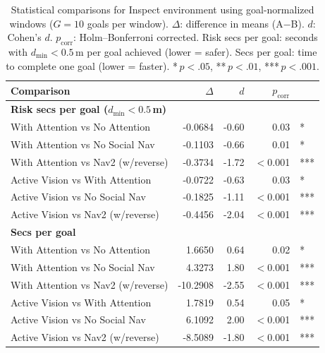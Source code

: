 \begin{table}[h]
\centering
\small
\begin{tabular}{lrrrl}
\toprule
\textbf{Comparison} & \textbf{$\Delta$} & \textbf{$d$} & \textbf{$p_{\mathrm{corr}}$} & \\
\midrule
\multicolumn{5}{l}{\textbf{Risk secs per goal ($d_{\min} < 0.5$\,m)}} \\
\quad With Attention vs No Attention & -0.0684 & -0.60 & 0.03 & * \\
\quad With Attention vs No Social Nav & -0.1103 & -0.66 & 0.01 & * \\
\quad With Attention vs Nav2 (w/reverse) & -0.3734 & -1.72 & $<$0.001 & *** \\
\quad Active Vision vs With Attention & -0.0722 & -0.63 & 0.03 & * \\
\quad Active Vision vs No Social Nav & -0.1825 & -1.11 & $<$0.001 & *** \\
\quad Active Vision vs Nav2 (w/reverse) & -0.4456 & -2.04 & $<$0.001 & *** \\
\midrule
\multicolumn{5}{l}{\textbf{Secs per goal}} \\
\quad With Attention vs No Attention & 1.6650 & 0.64 & 0.02 & * \\
\quad With Attention vs No Social Nav & 4.3273 & 1.80 & $<$0.001 & *** \\
\quad With Attention vs Nav2 (w/reverse) & -10.2908 & -2.55 & $<$0.001 & *** \\
\quad Active Vision vs With Attention & 1.7819 & 0.54 & 0.05 & * \\
\quad Active Vision vs No Social Nav & 6.1092 & 2.00 & $<$0.001 & *** \\
\quad Active Vision vs Nav2 (w/reverse) & -8.5089 & -1.80 & $<$0.001 & *** \\
\bottomrule
\end{tabular}
\caption{Statistical comparisons for Inspect environment using goal-normalized windows ($G = 10$ goals per window). $\Delta$: difference in means (A$-$B). $d$: Cohen's $d$. $p_{\mathrm{corr}}$: Holm--Bonferroni corrected. Risk secs per goal: seconds with $d_{\min} < 0.5$\,m per goal achieved (lower = safer). Secs per goal: time to complete one goal (lower = faster). *\,$p < .05$, **\,$p < .01$, ***\,$p < .001$.}
\label{tab:stats_inspect}
\end{table}